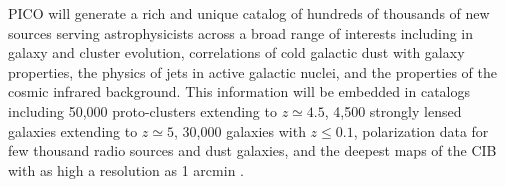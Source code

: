 \documentclass[PICOAPC.tex]{subfiles}
\begin{document}

PICO will generate a rich and unique catalog of hundreds of thousands of new sources serving astrophysicists across a broad range of interests including in galaxy and cluster evolution, correlations of cold galactic dust with galaxy properties, the physics of jets in active galactic nuclei, and the properties of the cosmic infrared background. This information will be embedded in catalogs including 50,000 proto-clusters extending to $z\simeq 4.5$, 4,500 strongly lensed galaxies extending to $z\simeq 5$, 30,000 galaxies with $z\leq 0.1$, polarization data for few thousand radio sources and dust galaxies, and the deepest maps of the CIB with as high a resolution as 1 arcmin . 
\end{document}
